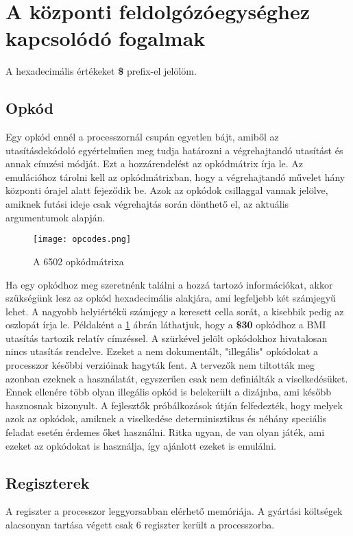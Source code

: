 \section{A központi feldolgózóegységhez kapcsolódó fogalmak}

\begin{note}
A hexadecimális értékeket \textbf{\$} prefix-el jelölöm.
\end{note}

\subsection{Opkód} 
Egy opkód ennél a processzornál csupán egyetlen bájt, amiből az utasításdekódoló egyértelműen meg tudja határozni a végrehajtandó utasítást és annak címzési módját.
Ezt a hozzárendelést az opkódmátrix írja le.
Az emulációhoz tárolni kell az opkódmátrixban, 
hogy a végrehajtandó művelet hány központi órajel alatt fejeződik be.
Azok az opkódok csillaggal vannak jelölve, amiknek futási ideje csak végrehajtás során dönthető el, az aktuális argumentumok alapján. 

\begin{figure}[H]
	\centering
	\texttt{[image: opcodes.png]}
	\caption{A 6502 opkódmátrixa}
	\label{fig:opcodes}
\end{figure}

Ha egy opkódhoz meg szeretnénk találni a hozzá tartozó információkat, akkor szükségünk lesz az opkód hexadecimális alakjára, ami legfeljebb két számjegyű lehet. A nagyobb helyiértékű számjegy a keresett cella sorát, a kisebbik pedig az oszlopát írja le. Példaként a \ref{fig:opcodes} ábrán láthatjuk, hogy a \textbf{\$30} opkódhoz a BMI utasítás tartozik relatív címzéssel.
A szürkével jelölt opkódokhoz hivatalosan nincs utasítás rendelve. 
Ezeket a nem dokumentált, "illegális" opkódokat a processzor későbbi 
verzióinak hagyták fent. A tervezők nem tiltották meg azonban ezeknek a használatát, 
egyszerűen csak nem definiálták a viselkedésüket. Ennek ellenére több olyan illegális opkód is belekerült a dizájnba, ami később hasznosnak bizonyult. A fejlesztők próbálkozások útján
felfedezték, hogy melyek azok az opkódok, amiknek a viselkedése determinisztikus és néhány speciális feladat esetén érdemes őket használni.
Ritka ugyan, de van olyan játék, ami ezeket az opkódokat is használja, így ajánlott ezeket is emulálni.

\subsection{Regiszterek}
A regiszter a processzor leggyorsabban elérhető memóriája.
A gyártási költségek alacsonyan tartása végett csak 6 regiszter került a processzorba.

